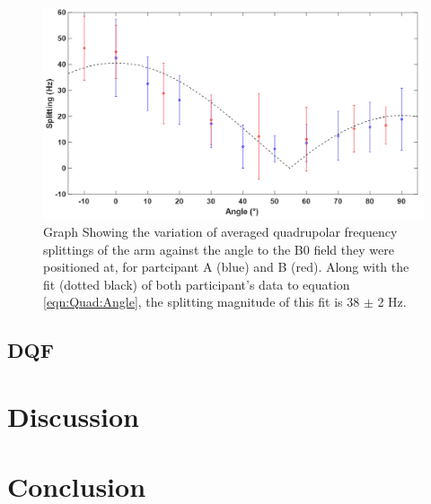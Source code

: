\documentclass[class=article, crop=false]{standalone}
\begin{document}
\begin{figure}
    \centering
    \includegraphics[width=1\textwidth]{Figures/Quad/Split_Angle_1.png}
    \caption{Graph Showing the variation of averaged quadrupolar frequency splittings of the arm against the angle to the B0 field they were positioned at, for partcipant A (blue) and B (red). Along with the fit (dotted black) of both participant's data to equation \ref{eqn:Quad:Angle}, the splitting magnitude of this fit is 38 $\pm$ 2 Hz.}
    \label{fig:D2O:Split_Angle}
\end{figure}

\subsection{DQF}

\section{Discussion}

\section{Conclusion}

\end{document}
